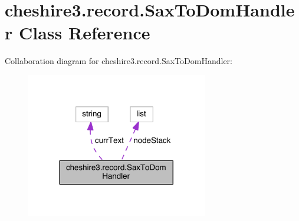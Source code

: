 \hypertarget{classcheshire3_1_1record_1_1_sax_to_dom_handler}{\section{cheshire3.\-record.\-Sax\-To\-Dom\-Handler Class Reference}
\label{classcheshire3_1_1record_1_1_sax_to_dom_handler}
}


Collaboration diagram for cheshire3.\-record.\-Sax\-To\-Dom\-Handler\-:
\nopagebreak
\begin{figure}[H]
\begin{center}
\leavevmode
\includegraphics[width=224pt]{classcheshire3_1_1record_1_1_sax_to_dom_handler__coll__graph}
\end{center}
\end{figure}
